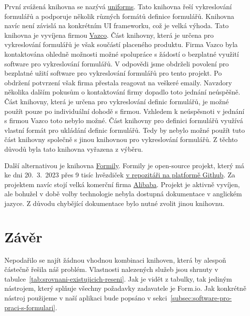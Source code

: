 První zvážená knihovna se nazývá \href{https://uniforms.tools/}{uniforms}.
Tato knihovna řeší vykreslování formulářů a podporuje několik různých formátů definice formulářů.
Knihovna navíc není závislá na konkrétním UI frameworku, což je velká výhoda.
Tato knihovna je vyvíjena firmou \href{https://www.vazco.eu/}{Vazco}.
Část knihovny, která je určena pro vykreslování formulářů je však součástí placeného produktu.
Firma Vazco byla kontaktována ohledně možnosti možné spolupráce s žádostí o bezplatné využití software pro vykreslování formulářů.
V odpovědi jsme obdrželi povolení pro bezplatné užití software pro vykreslování formulářů pro tento projekt.
Po obdržení potvrzení však firma přestala reagovat na veškeré emaily.
Navzdory několika dalším pokusům o kontaktování firmy dopadlo toto jednání neúspěšně.
Část knihovny, která je určena pro vykreslování definic formulářů, je možné použít pouze po individuální dohodě s firmou.
Vzhledem k neúspěsnoti v jednání s firmou Vazco toto nebylo možné.
Část knihovny pro definici formulářů využívá vlastní formát pro ukládání definic formulářů.
Tedy by nebylo možné použít tuto část knihovny společně s jinou knihovnou pro vykreslování formulářů.
Z těchto důvodů byla tato knihovna vyřazena z výběru.

Další alternativou je knihovna \href{https://formilyjs.org/}{Formily}.
Formily je open-source projekt, který má ke dni 20.\ 3.\ 2023 přes 9 tisíc hvězdiček \href{https://github.com/alibaba/formily}{v repozitáři na platformě Github}.
Za projektem navíc stojí velká komerční firma \href{https://www.alibaba.com/}{Alibaba}.
Projekt je aktivně vyvíjen, ale bohužel v době volby technologie nebyla dostupná dokumentace v anglickém jazyce.
Z důvodu chybějící dokumentace bylo nutné zvolit jinou knihovnu.

\section*{Závěr}\label{sec:zaver-analyzy-existujicich-reseni}

Nepodařilo se najít žádnou vhodnou kombinaci knihoven, která by alespoň částečně řešila náš problém.
Vlastnosti nalezených služeb jsou shrnuty v tabulce~\ref{tab:srovnani-existujicich-reseni}.
Jak je vidět z tabulky, tak jediným nástrojem, který splňuje všechny požadavky zadavatele je Form.io.
Jak konkrétně nástroj použijeme v naší aplikaci bude popsáno v sekci~\ref{subsec:software-pro-praci-s-formulari}.

\newcommand{\yes}{\tikzcmark\ Ano}
\newcommand{\no}{\tikzxmark\ Ne}
\renewcommand\tabularxcolumn[1]{m{#1}} %

